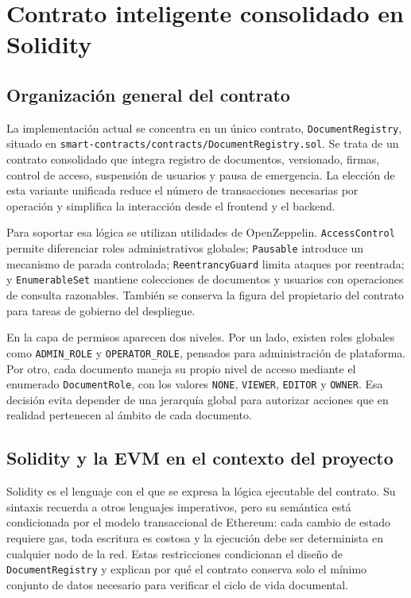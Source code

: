 \documentclass[11pt, a4paper]{article}
\begin{document}
\section{Contrato inteligente consolidado en Solidity}

\subsection{Organización general del contrato}

La implementación actual se concentra en un único contrato, \texttt{DocumentRegistry}, situado en \texttt{smart-contracts/contracts/DocumentRegistry.sol}. Se trata de un contrato consolidado que integra registro de documentos, versionado, firmas, control de acceso, suspensión de usuarios y pausa de emergencia. La elección de esta variante unificada reduce el número de transacciones necesarias por operación y simplifica la interacción desde el frontend y el backend.

Para soportar esa lógica se utilizan utilidades de OpenZeppelin. \texttt{AccessControl} permite diferenciar roles administrativos globales; \texttt{Pausable} introduce un mecanismo de parada controlada; \texttt{ReentrancyGuard} limita ataques por reentrada; y \texttt{EnumerableSet} mantiene colecciones de documentos y usuarios con operaciones de consulta razonables. También se conserva la figura del propietario del contrato para tareas de gobierno del despliegue.

En la capa de permisos aparecen dos niveles. Por un lado, existen roles globales como \texttt{ADMIN\_ROLE} y \texttt{OPERATOR\_ROLE}, pensados para administración de plataforma. Por otro, cada documento maneja su propio nivel de acceso mediante el enumerado \texttt{DocumentRole}, con los valores \texttt{NONE}, \texttt{VIEWER}, \texttt{EDITOR} y \texttt{OWNER}. Esa decisión evita depender de una jerarquía global para autorizar acciones que en realidad pertenecen al ámbito de cada documento.

\subsection{Solidity y la EVM en el contexto del proyecto}

Solidity es el lenguaje con el que se expresa la lógica ejecutable del contrato. Su sintaxis recuerda a otros lenguajes imperativos, pero su semántica está condicionada por el modelo transaccional de Ethereum: cada cambio de estado requiere gas, toda escritura es costosa y la ejecución debe ser determinista en cualquier nodo de la red. Estas restricciones condicionan el diseño de \texttt{DocumentRegistry} y explican por qué el contrato conserva solo el mínimo conjunto de datos necesario para verificar el ciclo de vida documental.
\end{document}
